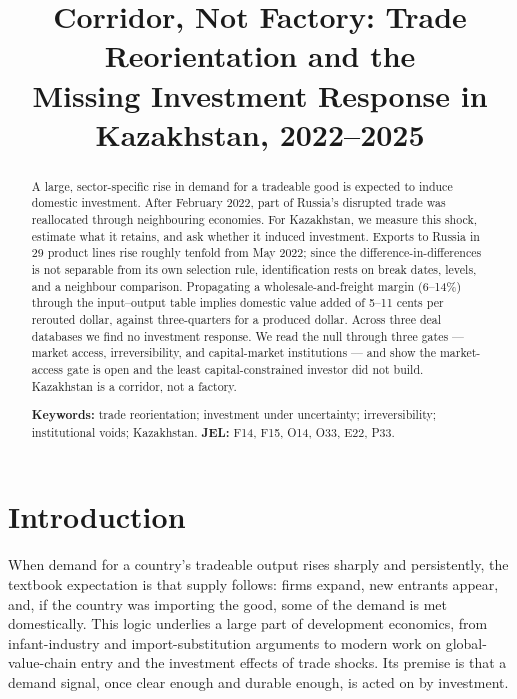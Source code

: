 \documentclass[12pt]{article}
\title{Corridor, Not Factory: Trade Reorientation and the\\
Missing Investment Response in Kazakhstan, 2022--2025}
\author{}
\date{}
\begin{document}
\maketitle

\begin{abstract}
\noindent A large, sector-specific rise in demand for a tradeable good is expected to induce
domestic investment. After February 2022, part of Russia's disrupted trade was reallocated
through neighbouring economies. For Kazakhstan, we measure this shock, estimate what it
retains, and ask whether it induced investment. Exports to Russia in 29 product lines rise
roughly tenfold from May 2022; since the difference-in-differences is not separable from its
own selection rule, identification rests on break dates, levels, and a neighbour comparison.
Propagating a wholesale-and-freight margin (6--14\%) through the input--output table implies
domestic value added of 5--11 cents per rerouted dollar, against three-quarters for a produced
dollar. Across three deal databases we find no investment response. We read the null through
three gates --- market access, irreversibility, and capital-market institutions --- and show
the market-access gate is open and the least capital-constrained investor did not build.
Kazakhstan is a corridor, not a factory.

\medskip
\noindent\textbf{Keywords:} trade reorientation; investment under uncertainty; irreversibility;
institutional voids; Kazakhstan.
\quad\textbf{JEL:} F14, F15, O14, O33, E22, P33.
\end{abstract}

\clearpage

\section{Introduction}

When demand for a country's tradeable output rises sharply and persistently, the textbook
expectation is that supply follows: firms expand, new entrants appear, and, if the country
was importing the good, some of the demand is met domestically. This logic underlies a large
part of development economics, from infant-industry and import-substitution arguments to
modern work on global-value-chain entry and the investment effects of trade shocks. Its
premise is that a demand signal, once clear enough and durable enough, is acted on by
investment.
\end{document}
